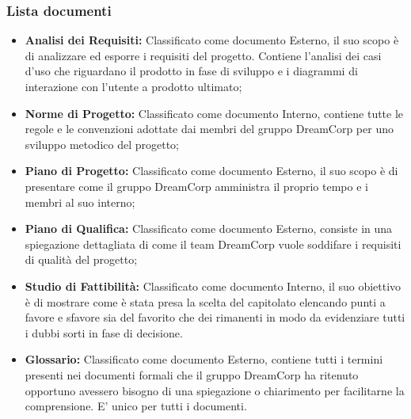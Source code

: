 		\subsubsection{Lista documenti}
		\label{3.1.5}
			\begin{itemize}
				\item \textbf{Analisi dei Requisiti:} \newline
				Classificato come documento Esterno, il suo scopo è di analizzare ed esporre i requisiti del progetto. Contiene l'analisi dei casi d'uso che riguardano il prodotto in fase di sviluppo e i diagrammi di interazione con l'utente a prodotto ultimato;
				\item \textbf{Norme di Progetto:} \newline
				Classificato come documento Interno, contiene tutte le regole e le convenzioni adottate dai membri del gruppo DreamCorp per uno sviluppo metodico del progetto;
				\item \textbf{Piano di Progetto:} \newline
				Classificato come documento Esterno, il suo scopo è di presentare come il gruppo DreamCorp amministra il proprio tempo e i membri al suo interno;
				\item \textbf{Piano di Qualifica:} \newline
				Classificato come documento Esterno, consiste in una spiegazione dettagliata di come il team DreamCorp vuole soddifare i requisiti di qualità del progetto;
				\item \textbf{Studio di Fattibilità:} \newline
				Classificato come documento Interno, il suo obiettivo è di mostrare come è stata presa la scelta del capitolato elencando punti a favore e sfavore sia del favorito che dei rimanenti in modo da evidenziare tutti i dubbi sorti in fase di decisione.
				\item \textbf{Glossario:} \newline
				Classificato come documento Esterno, contiene tutti i termini presenti nei documenti formali che il gruppo DreamCorp ha ritenuto opportuno avessero bisogno di una spiegazione o chiarimento per facilitarne la comprensione. E' unico per tutti i documenti.
			\end{itemize}
